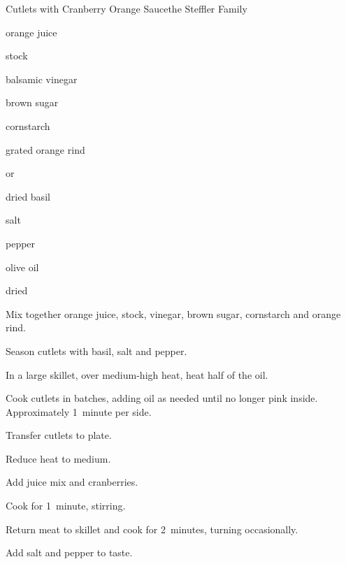 \begin{recipe}{Cutlets with Cranberry Orange Sauce}{the Steffler Family}{}

\begin{ingredients}
\item \C{\third} orange juice
\item \C{\third}  stock
\item {} balsamic vinegar
\item {} brown sugar
\item {} cornstarch
\item {} grated orange rind
\item {}  or 
\item {} dried basil
\item \tp{\half} salt
\item \tp{\quarter} pepper
\item {} olive oil
\item \C{\quarter} dried 
\end{ingredients}

\begin{directions}
\item Mix together orange juice, stock, vinegar, brown sugar, cornstarch and orange rind.
\item Season cutlets with basil, salt and pepper.
\item In a large skillet, over medium-high heat, heat half of the oil.
\item Cook cutlets in batches, adding oil as needed until no longer pink inside. Approximately 1~minute per side.
\item Transfer cutlets to plate.
\item Reduce heat to medium.
\item Add juice mix and cranberries.
\item Cook for 1~minute, stirring.
\item Return meat to skillet and cook for 2~minutes, turning occasionally.
\item Add salt and pepper to taste.
\end{directions}
\end{recipe}
